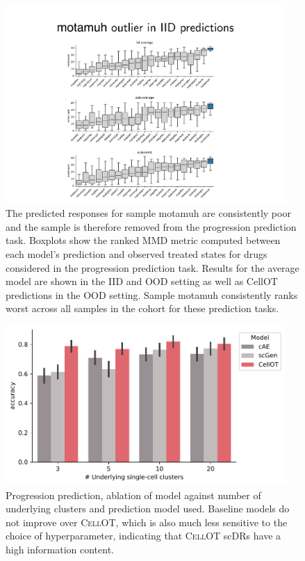 \begin{figure}
  \begin{center}
    \includegraphics[width=0.95\textwidth]{figures/cellot-cohort/progression-exclude-motamuh.pdf}
  \end{center}
  \caption{
    The predicted responses for sample motamuh are consistently poor and the sample is therefore removed from the progression prediction task.
    Boxplots show the ranked MMD metric computed between each model's prediction and observed treated states for drugs considered in the progression prediction task.
    Results for the average model are shown in the IID and OOD setting as well as CellOT predictions in the OOD setting.
    Sample motamuh consistently ranks worst across all samples in the cohort for these prediction tasks.
  }\label{fig:progression-exclude-motamuh}
\end{figure}

\begin{figure}[h]
  \begin{center}
    \includegraphics[width=0.95\textwidth]{figures/cellot-cohort/supplement/survival-accuracies-baselines.pdf}
  \end{center}
  \caption{Progression prediction, ablation of model against number of underlying clusters and prediction model used. Baseline models do not improve over \textsc{CellOT}, which is also much less sensitive to the choice of hyperparameter, indicating that \textsc{CellOT} scDRs have a high information content.
  }
\label{fig:survival-accuracies}
\end{figure}
